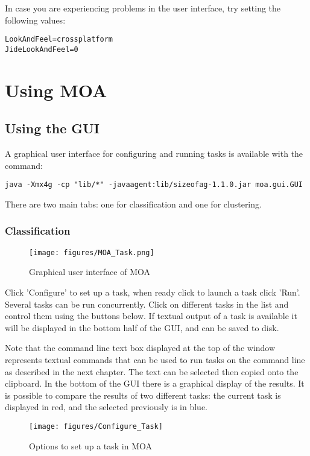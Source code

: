 \documentclass[a4paper,12pt,twoside]{book}
\begin{document}
In case you are experiencing problems in the user interface, try setting the
following values:
{\scriptsize
\begin{verbatim}
LookAndFeel=crossplatform
JideLookAndFeel=0
\end{verbatim}}

\chapter{Using MOA}
\section{Using the GUI}
A graphical user interface for configuring and running tasks is available with the command:

\begin{verbatim}
java -Xmx4g -cp "lib/*" -javaagent:lib/sizeofag-1.1.0.jar moa.gui.GUI
\end{verbatim}

There are two main tabs: one for classification and one for clustering.

\subsection{Classification}

\begin{figure}[ht]
\begin{center}
\texttt{[image: figures/MOA\_Task.png]}\end{center}
\caption{Graphical user interface of MOA}
\end{figure}

Click 'Configure' to set up a task, when ready click to launch a task click 'Run'. Several tasks can be run concurrently. Click on different tasks in the list and control them using the buttons below. If textual output of a task is available it will be displayed in the bottom half of the GUI, and can be saved to disk.

Note that the command line text box displayed at the top of the window represents textual commands that can be used to run tasks on the command line as described in the next chapter.
The text can be selected then copied onto the clipboard. 
In the bottom of the GUI there is a graphical display of the results. It is possible
to compare the results of two different tasks: the current task is displayed in red, and the selected previously is in blue. 

\begin{figure}[t]
\begin{center}
\texttt{[image: figures/Configure\_Task]}\end{center}
\caption{Options to set up a task in MOA}
\end{figure}
\end{document}

